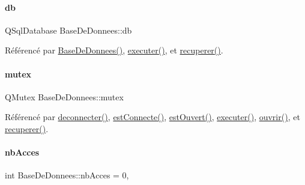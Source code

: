 \paragraph{\texorpdfstring{db}{db}}
{\footnotesize\ttfamily Q\+Sql\+Database Base\+De\+Donnees\+::db\hspace{0.3cm}{\ttfamily [private]}}



Référencé par \hyperlink{class_base_de_donnees_ac4d0c514f439b3a19dc35c159955373a}{Base\+De\+Donnees()}, \hyperlink{class_base_de_donnees_aa8de5f8f8bb17edc43f5c0ee33712081}{executer()}, et \hyperlink{class_base_de_donnees_a77539baad389f5acf754cd2cd452403e}{recuperer()}.

\mbox{\label{class_base_de_donnees_aa1b4696fac87a740f914aa73739086f2}} 
\paragraph{\texorpdfstring{mutex}{mutex}}
{\footnotesize\ttfamily Q\+Mutex Base\+De\+Donnees\+::mutex\hspace{0.3cm}{\ttfamily [private]}}



Référencé par \hyperlink{class_base_de_donnees_ae780999d25a26a0e4dbe0706a4785978}{deconnecter()}, \hyperlink{class_base_de_donnees_a00388973f3ec42e5c8e76e7af7e124b2}{est\+Connecte()}, \hyperlink{class_base_de_donnees_af9ac332082ffd0dd35e412cefabe5e9c}{est\+Ouvert()}, \hyperlink{class_base_de_donnees_aa8de5f8f8bb17edc43f5c0ee33712081}{executer()}, \hyperlink{class_base_de_donnees_a7f6a5510b08017b0d99115a84252f186}{ouvrir()}, et \hyperlink{class_base_de_donnees_a77539baad389f5acf754cd2cd452403e}{recuperer()}.

\mbox{\label{class_base_de_donnees_a5099ecb2922bb31d84cd5d4505298a29}} 
\paragraph{\texorpdfstring{nb\+Acces}{nbAcces}}
{\footnotesize\ttfamily int Base\+De\+Donnees\+::nb\+Acces = 0\hspace{0.3cm}{\ttfamily [static]}, {\ttfamily [private]}}



